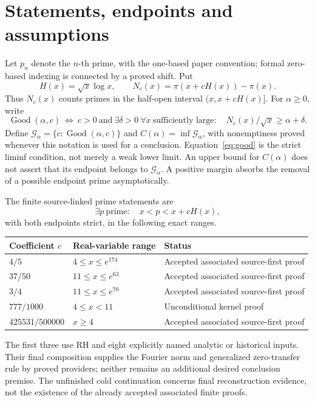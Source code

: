 \documentclass[11pt]{article}
\newcommand{\Good}{\operatorname{Good}}
\begin{document}
\section{Statements, endpoints and assumptions}
Let \(p_n\) denote the \(n\)-th prime, with the one-based paper convention;
formal zero-based indexing is connected by a proved shift. Put
\[
 H(x)=\sqrt{x}\log x,\qquad
 N_c(x)=\pi(x+cH(x))-\pi(x).
\]
Thus \(N_c(x)\) counts primes in the half-open interval \((x,x+cH(x)]\).
For \(\alpha\ge0\), write
\[
 \Good(\alpha,c)\ \Longleftrightarrow\
 c>0\ \text{and}\ \exists\delta>0\
 \forall x\ \text{sufficiently large}:\quad N_c(x)/\sqrt{x}\ge\alpha+\delta.
 \tag{1}\label{eq:good}
\]
Define \(\mathcal G_\alpha=\{c:\Good(\alpha,c)\}\) and
\(C(\alpha)=\inf\mathcal G_\alpha\), with nonemptiness proved whenever this
notation is used for a conclusion. Equation~\eqref{eq:good} is the strict
liminf condition, not merely a weak lower limit. An upper bound for
\(C(\alpha)\) does not assert that its endpoint belongs to \(\mathcal G_\alpha\).
A positive margin absorbs the removal of a possible endpoint prime
asymptotically.

The finite source-linked prime statements are
\[
 \exists p\ \text{prime}:\quad x<p<x+cH(x),
 \tag{2}\label{eq:finite}
\]
with both endpoints strict, in the following exact ranges.
\begin{center}
\begin{tabular}{lll}
\toprule
Coefficient \(c\)&Real-variable range&Status\\
\midrule
\(4/5\)&\(4\le x\le e^{174}\)&Accepted associated source-first proof\\
\(37/50\)&\(11\le x\le e^{63}\)&Accepted associated source-first proof\\
\(3/4\)&\(11\le x\le e^{70}\)&Accepted associated source-first proof\\
\(777/1000\)&\(4\le x<11\)&Unconditional kernel proof\\
\(425531/500000\)&\(x\ge4\)&Accepted associated source-first proof\\
\bottomrule
\end{tabular}
\end{center}
The first three use RH and eight explicitly named analytic or historical
inputs. Their final composition supplies the Fourier norm and generalized
zero-transfer rule by proved providers; neither remains an additional desired
conclusion premise. The unfinished cold continuation concerns final
reconstruction evidence, not the existence of the already accepted associated
finite proofs.
\end{document}
